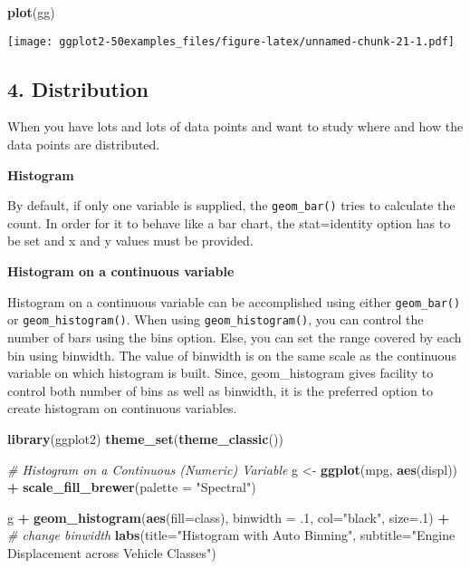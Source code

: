 \documentclass[a4paper]{article}
\newenvironment{Shaded}{\begin{snugshade}}{\end{snugshade}}
\newcommand{\KeywordTok}[1]{\textcolor[rgb]{0.13,0.29,0.53}{\textbf{#1}}}
\newcommand{\DataTypeTok}[1]{\textcolor[rgb]{0.13,0.29,0.53}{#1}}
\newcommand{\DecValTok}[1]{\textcolor[rgb]{0.00,0.00,0.81}{#1}}
\newcommand{\StringTok}[1]{\textcolor[rgb]{0.31,0.60,0.02}{#1}}
\newcommand{\CommentTok}[1]{\textcolor[rgb]{0.56,0.35,0.01}{\textit{#1}}}
\newcommand{\OperatorTok}[1]{\textcolor[rgb]{0.81,0.36,0.00}{\textbf{#1}}}
\newcommand{\NormalTok}[1]{#1}
\begin{document}
\begin{Shaded}
\begin{Highlighting}[]
\KeywordTok{plot}\NormalTok{(gg)}
\end{Highlighting}
\end{Shaded}

\texttt{[image: ggplot2-50examples\_files/figure-latex/unnamed-chunk-21-1.pdf]}

\newpage

\subsection{4. Distribution}\label{distribution}

When you have lots and lots of data points and want to study where and
how the data points are distributed.

\textbf{Histogram}

By default, if only one variable is supplied, the \texttt{geom\_bar()}
tries to calculate the count. In order for it to behave like a bar
chart, the stat=identity option has to be set and x and y values must be
provided.

\textbf{Histogram on a continuous variable}

Histogram on a continuous variable can be accomplished using either
\texttt{geom\_bar()} or \texttt{geom\_histogram()}. When using
\texttt{geom\_histogram()}, you can control the number of bars using the
bins option. Else, you can set the range covered by each bin using
binwidth. The value of binwidth is on the same scale as the continuous
variable on which histogram is built. Since, geom\_histogram gives
facility to control both number of bins as well as binwidth, it is the
preferred option to create histogram on continuous variables.

\begin{Shaded}
\begin{Highlighting}[]
\KeywordTok{library}\NormalTok{(ggplot2)}
\KeywordTok{theme_set}\NormalTok{(}\KeywordTok{theme_classic}\NormalTok{())}

\CommentTok{# Histogram on a Continuous (Numeric) Variable}
\NormalTok{g <-}\StringTok{ }\KeywordTok{ggplot}\NormalTok{(mpg, }\KeywordTok{aes}\NormalTok{(displ)) }\OperatorTok{+}\StringTok{ }\KeywordTok{scale_fill_brewer}\NormalTok{(}\DataTypeTok{palette =} \StringTok{"Spectral"}\NormalTok{)}

\NormalTok{g }\OperatorTok{+}\StringTok{ }\KeywordTok{geom_histogram}\NormalTok{(}\KeywordTok{aes}\NormalTok{(}\DataTypeTok{fill=}\NormalTok{class), }
                   \DataTypeTok{binwidth =}\NormalTok{ .}\DecValTok{1}\NormalTok{, }
                   \DataTypeTok{col=}\StringTok{"black"}\NormalTok{, }
                   \DataTypeTok{size=}\NormalTok{.}\DecValTok{1}\NormalTok{) }\OperatorTok{+}\StringTok{  }\CommentTok{# change binwidth}
\StringTok{  }\KeywordTok{labs}\NormalTok{(}\DataTypeTok{title=}\StringTok{"Histogram with Auto Binning"}\NormalTok{, }
       \DataTypeTok{subtitle=}\StringTok{"Engine Displacement across Vehicle Classes"}\NormalTok{)  }
\end{Highlighting}
\end{Shaded}
\end{document}
